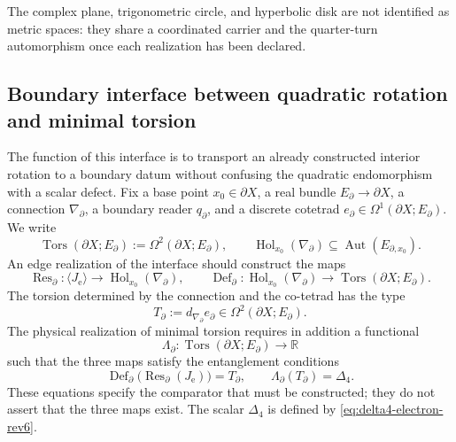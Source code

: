 The complex plane, trigonometric circle, and hyperbolic disk are not
identified as metric spaces: they share a coordinated carrier and the
quarter-turn automorphism once each realization has been declared.

\subsection{Boundary interface between quadratic rotation and minimal torsion}
\label{p3-83-c44-s2:sec:interfaz-frontera-rotacion-torsion-minima-rev3}

The function of this interface is to transport an already constructed interior
rotation to a boundary datum without confusing the quadratic endomorphism
with a scalar defect. Fix a base point
\(x_0\in\partial X\), a real bundle
\(E_{\partial}\to\partial X\), a connection \(\nabla_{\partial}\), a
boundary reader \(q_{\partial}\), and a discrete cotetrad
\(e_{\partial}\in\Omega^1(\partial X;E_{\partial})\). We write
\[
 \operatorname{Tors}(\partial X;E_{\partial})
 :=\Omega^2(\partial X;E_{\partial}),
 \qquad
 \operatorname{Hol}_{x_0}(\nabla_{\partial})
 \subseteq\operatorname{Aut}(E_{\partial,x_0}).
\]
An edge realization of the interface should construct the maps
\[
 \operatorname{Res}_{\partial}:
 \langle J_{\mathrm e}\rangle
 \longrightarrow\operatorname{Hol}_{x_0}(\nabla_{\partial}),
 \qquad
 \operatorname{Def}_{\partial}:
 \operatorname{Hol}_{x_0}(\nabla_{\partial})
 \longrightarrow\operatorname{Tors}(\partial X;E_{\partial}).
\]
The torsion determined by the connection and the co-tetrad has the type
\begin{equation}
 T_{\partial}
 :=d_{\nabla_{\partial}}e_{\partial}
 \in\Omega^2(\partial X;E_{\partial}).
 \label{p3-83-c44-s2:eq:torsion-borde-interfaz-euler-rev3}
\end{equation}
The physical realization of minimal torsion requires in addition a functional
\begin{equation}
 \Lambda_{\partial}:
 \operatorname{Tors}(\partial X;E_{\partial})\longrightarrow\mathbb R
 \label{p3-83-c44-s2:eq:funcional-borde-delta4-interfaz-rev3}
\end{equation}
such that the three maps satisfy the entanglement conditions
\begin{equation}
 \operatorname{Def}_{\partial}
 \bigl(\operatorname{Res}_{\partial}(J_{\mathrm e})\bigr)=T_{\partial},
 \qquad
 \Lambda_{\partial}(T_{\partial})=\Delta_4.
 \label{p3-83-c44-s2:eq:condiciones-borde-delta4-interfaz-rev3}
\end{equation}
These equations specify the comparator that must be constructed; they do not assert
that the three maps exist. The scalar \(\Delta_4\) is defined by
\cref{eq:delta4-electron-rev6}.

